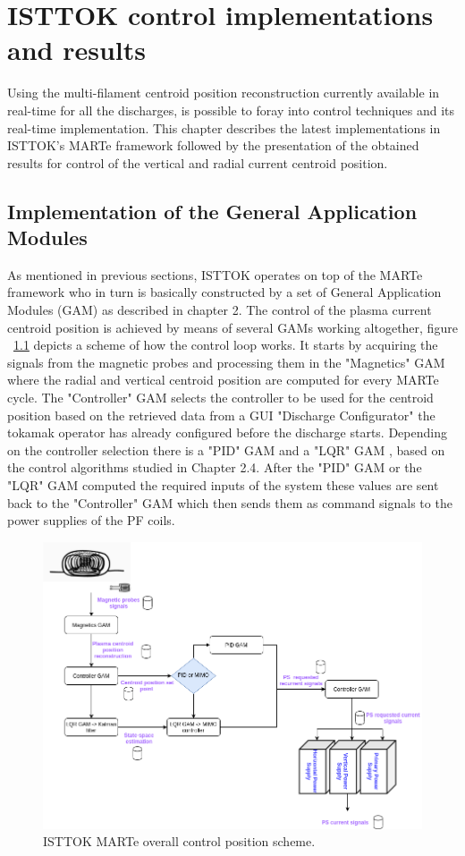 \chapter{ISTTOK control implementations and results }

Using the multi-filament centroid position reconstruction currently available in real-time for all the discharges, is possible to foray into control techniques and its real-time implementation. This chapter describes the latest implementations in ISTTOK's  MARTe framework followed by the presentation of the obtained results for control of the vertical and radial current centroid position.

\section{Implementation of the General Application Modules }

As mentioned in previous sections, ISTTOK operates on top of the MARTe framework who in turn is basically constructed by a set of General Application Modules (GAM) as described in chapter 2. The control of the plasma current centroid position is achieved by means of several GAMs working altogether,  figure ~\ref{GAMsDiags} depicts a scheme of how the control loop works. It starts by acquiring  the signals from the magnetic probes and processing them in the "Magnetics" GAM where the radial and vertical centroid position are computed for every MARTe cycle. The "Controller" GAM selects the controller to be used for the centroid position based on the retrieved data from a GUI "Discharge Configurator" the tokamak operator has already configured before the discharge starts. Depending on the controller selection there is a "PID" GAM and a "LQR" GAM , based on the control algorithms studied in Chapter 2.4. After the "PID" GAM or the "LQR" GAM computed the required  inputs of the system these values are sent back to the "Controller" GAM which then sends them as command signals to the power supplies of the PF coils.\smallskip

\begin{figure}[h]
	\centering
	\includegraphics[width=1.0\textwidth]{Chp5/GAMsDiagram.png}	
	\caption{ISTTOK MARTe overall control position  scheme. \label{GAMsDiags}}
\end{figure}

